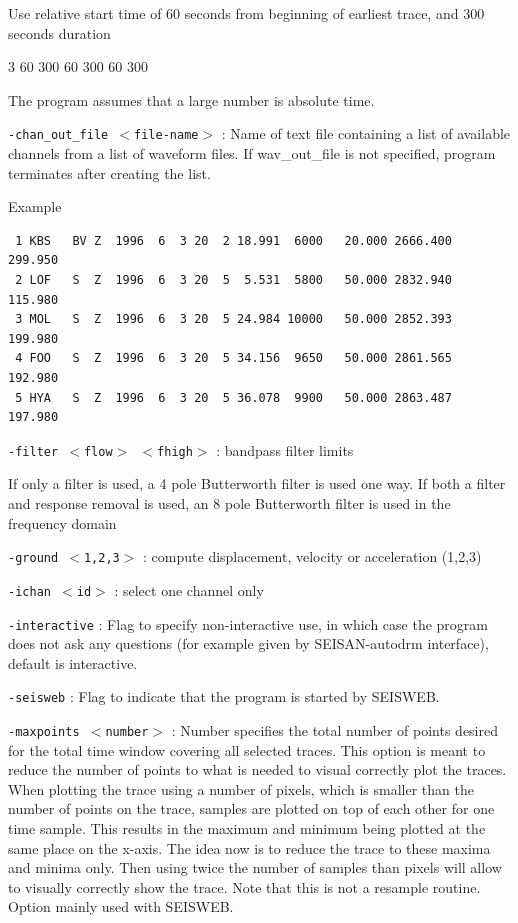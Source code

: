 Use relative start time of 60 seconds from beginning of earliest trace, and 300 seconds duration 

3  60 300  60 300  60 300 

The program assumes that a large number is absolute time. 

\texttt{-chan\_out\_file $<$file-name$>$} : Name of text file containing 
a list of available channels from a list of waveform files. If 
wav\_out\_file is not specified, program terminates after creating the list. 

Example  

\begin{verbatim}
 1 KBS   BV Z  1996  6  3 20  2 18.991  6000   20.000 2666.400  299.950  
 2 LOF   S  Z  1996  6  3 20  5  5.531  5800   50.000 2832.940  115.980  
 3 MOL   S  Z  1996  6  3 20  5 24.984 10000   50.000 2852.393  199.980  
 4 FOO   S  Z  1996  6  3 20  5 34.156  9650   50.000 2861.565  192.980  
 5 HYA   S  Z  1996  6  3 20  5 36.078  9900   50.000 2863.487  197.980  
\end{verbatim}

\texttt{-filter $<$flow$>$ $<$fhigh$>$} : bandpass filter limits  

If only a filter is used, a 4 pole Butterworth filter is used one way. 
If both a filter and response removal is used, an 8 pole Butterworth 
filter is used in the frequency domain 



\texttt{-ground $<$1,2,3$>$} : compute displacement, velocity or acceleration (1,2,3) 

\texttt{-ichan $<$id$>$} : select one channel only 

\texttt{-interactive} : Flag to specify non-interactive use, in which case the program does not ask any questions (for example given by SEISAN-autodrm interface), default is interactive. 

\texttt{-seisweb} : Flag to indicate that the program is started by SEISWEB. 

\texttt{-maxpoints $<$number$>$} : Number specifies the total number of points desired for the total time window covering all selected traces. This option is meant to reduce the number of points to what is needed to visual correctly plot the traces. When plotting the trace using a number of pixels, which is smaller than the number of points on the trace, samples are plotted on top of each other for one time sample. This results in the maximum and minimum being plotted at the same place on the x-axis. The idea now is to reduce the trace to these maxima and minima only. Then using twice the number of samples than pixels will allow to visually correctly show the trace. Note that this is not a resample routine. Option mainly used with SEISWEB. 

